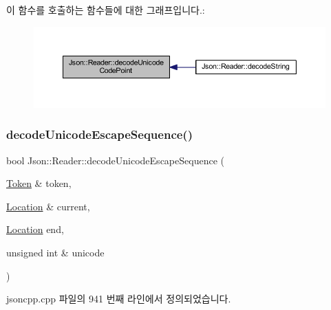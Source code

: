 이 함수를 호출하는 함수들에 대한 그래프입니다.\+:\nopagebreak
\begin{figure}[H]
\begin{center}
\leavevmode
\includegraphics[width=350pt]{class_json_1_1_reader_a8fe24db3e9953aef3d637a56447e795c_icgraph}
\end{center}
\end{figure}
\mbox{\label{class_json_1_1_reader_a469cb6f55971d7c41fca2752a3aa5bf7}} 
\subsubsection{\texorpdfstring{decode\+Unicode\+Escape\+Sequence()}{decodeUnicodeEscapeSequence()}}
{\footnotesize\ttfamily bool Json\+::\+Reader\+::decode\+Unicode\+Escape\+Sequence (\begin{DoxyParamCaption}\item[{\hyperlink{class_json_1_1_reader_1_1_token}{Token} \&}]{token,  }\item[{\hyperlink{class_json_1_1_reader_a46795b5b272bf79a7730e406cb96375a}{Location} \&}]{current,  }\item[{\hyperlink{class_json_1_1_reader_a46795b5b272bf79a7730e406cb96375a}{Location}}]{end,  }\item[{unsigned int \&}]{unicode }\end{DoxyParamCaption})\hspace{0.3cm}{\ttfamily [private]}}



jsoncpp.\+cpp 파일의 941 번째 라인에서 정의되었습니다.


